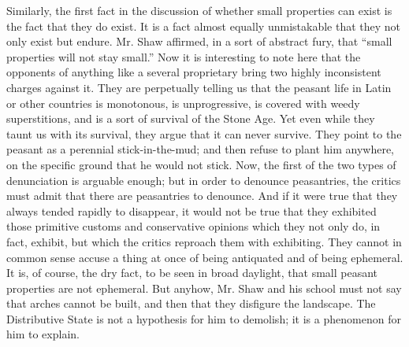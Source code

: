 \documentclass{book}
\begin{document}
Similarly, the first fact in the discussion of whether small properties can exist is the fact that they do exist. It is a fact almost equally unmistakable that they not only exist but endure. Mr. Shaw affirmed, in a sort of abstract fury, that “small properties will not stay small.” Now it is interesting to note here that the opponents of anything like a several proprietary bring two highly inconsistent charges against it. They are perpetually telling us that the peasant life in Latin or other countries is monotonous, is unprogressive, is covered with weedy superstitions, and is a sort of survival of the Stone Age. Yet even while they taunt us with its survival, they argue that it can never survive. They point to the peasant as a perennial stick-in-the-mud; and then refuse to plant him anywhere, on the specific ground that he would not stick. Now, the first of the two types of denunciation is arguable enough; but in order to denounce peasantries, the critics must admit that there are peasantries to denounce. And if it were true that they always tended rapidly to disappear, it would not be true that they exhibited those primitive customs and conservative opinions which they not only do, in fact, exhibit, but which the critics reproach them with exhibiting. They cannot in common sense accuse a thing at once of being antiquated and of being ephemeral. It is, of course, the dry fact, to be seen in broad daylight, that small peasant properties are not ephemeral. But anyhow, Mr. Shaw and his school must not say that arches cannot be built, and then that they disfigure the landscape. The Distributive State is not a hypothesis for him to demolish; it is a phenomenon for him to explain.
\end{document}
